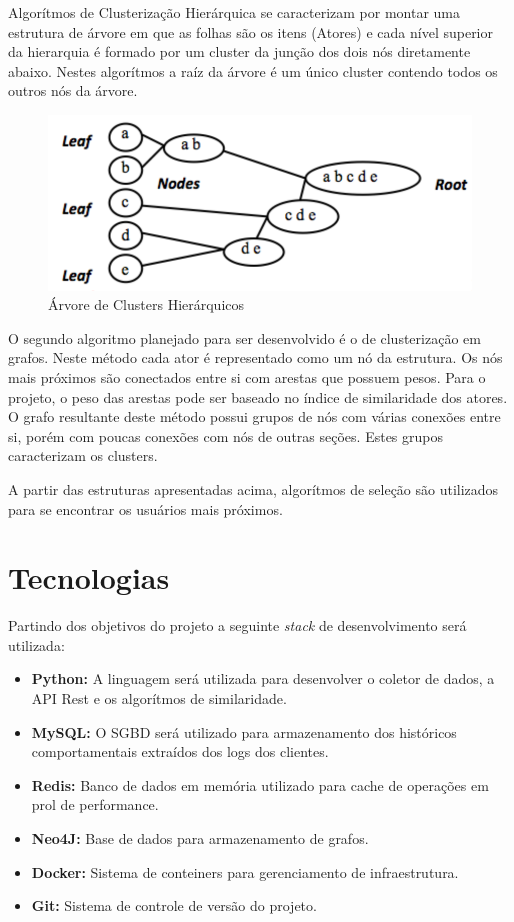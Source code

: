 \documentclass[
	12pt,				%
    oneside,			%
	a4paper,			%
	english,			%
	french,				%
	spanish,			%
	brazil,				%
	]{abntex2}
\begin{document}
Algorítmos de Clusterização Hierárquica se caracterizam por montar uma estrutura de árvore em que as folhas são os itens (Atores) e cada nível superior da hierarquia é formado por um cluster da junção dos dois nós diretamente abaixo. Nestes algorítmos a raíz da árvore é um
único cluster contendo todos os outros nós da árvore.

\begin{figure}[hbt]
	\label{Árvore de Clusters Hierárquicos}
	\caption{Árvore de Clusters Hierárquicos}
	\includegraphics{hierarquical-clustering-01.png}
\end{figure}

O segundo algoritmo planejado para ser desenvolvido é o de clusterização em grafos. Neste método cada ator é representado como um nó da estrutura. Os nós mais próximos são conectados entre si com arestas que possuem pesos. Para o projeto, o peso das
arestas pode ser baseado no índice de similaridade dos atores. O grafo resultante deste método possui grupos de nós com várias conexões entre si, porém com poucas conexões com nós de outras seções. Estes grupos caracterizam os clusters.

A partir das estruturas apresentadas acima, algorítmos de seleção são utilizados para se encontrar os usuários mais próximos.

\section{Tecnologias}
Partindo dos objetivos do projeto a seguinte \textit{stack} de desenvolvimento será utilizada:

\begin{itemize}
	\item \textbf{Python:} A linguagem será utilizada para desenvolver o coletor de dados, a API Rest e os algorítmos de similaridade.
	\item \textbf{MySQL:} O SGBD será utilizado para armazenamento dos históricos comportamentais extraídos dos logs dos clientes.
	\item \textbf{Redis:} Banco de dados em memória utilizado para cache de operações em prol de performance.
	\item \textbf{Neo4J:} Base de dados para armazenamento de grafos.
	\item \textbf{Docker:} Sistema de conteiners para gerenciamento de infraestrutura.
	\item \textbf{Git:} Sistema de controle de versão do projeto.
\end{itemize}
\end{document}
